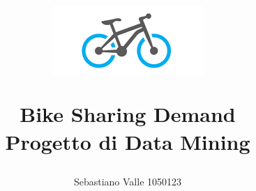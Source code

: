 \documentclass[
article,
10pt, %
oneside, %
BCOR5mm, %
]{scrartcl}
\begin{document}
\begin{center}
\title{
  \begin{figure}[h!]
  \centering
  \includegraphics[width=.3\columnwidth]{images/project_logo.png}
  \end{figure}
  Bike Sharing Demand \\
  Progetto di \textbf{Data Mining}
}
\author{
Sebastiano Valle 1050123}
\end{center} %









\maketitle %

\setcounter{page}{1} %


\raggedright{}
\newpage{}
\tableofcontents %



\listoffigures %

\listoftables %



\newpage %
\end{document}
